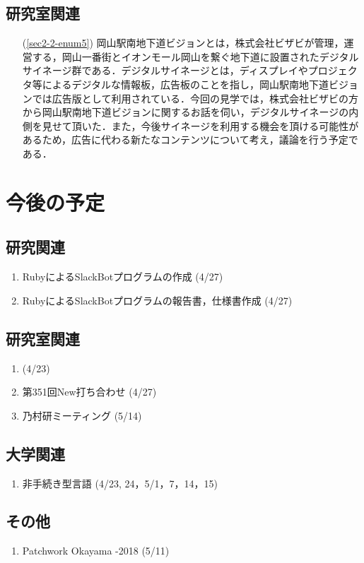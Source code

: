 \documentclass[fleqn, 14pt]{extarticle}
\begin{document}
\subsection{研究室関連}
\label{sec3-2}
\begin{itemize}
\item[(\ref{sec2-2-enum5})] 岡山駅南地下道ビジョンとは，株式会社ビザビが管理，運営する，岡山一番街とイオンモール岡山を繋ぐ地下道に設置されたデジタルサイネージ群である．デジタルサイネージとは，ディスプレイやプロジェクタ等によるデジタルな情報板，広告板のことを指し，岡山駅南地下道ビジョンでは広告版として利用されている．今回の見学では，株式会社ビザビの方から岡山駅南地下道ビジョンに関するお話を伺い，デジタルサイネージの内側を見せて頂いた．また，今後サイネージを利用する機会を頂ける可能性があるため，広告に代わる新たなコンテンツについて考え，議論を行う予定である．
\end{itemize}

\section{今後の予定}
\label{sec4}
\subsection{研究関連}
\label{sec4-1}
\begin{enumerate}
\item RubyによるSlackBotプログラムの作成
  \hfill
  \label{sec4-1-enum1}
  (4/27)
\item RubyによるSlackBotプログラムの報告書，仕様書作成
  \hfill
  \label{sec4-1-enum2}
  (4/27)
\end{enumerate}

\subsection{研究室関連}
\label{sec4-2}
\begin{enumerate}
\item
  \hfill
  \label{sec4-2-enum1}
  (4/23)
\item 第351回New打ち合わせ
  \hfill
  \label{sec4-2-enum1}
  (4/27)
\item 乃村研ミーティング
  \hfill
  \label{sec4-2-enum1}
  (5/14)

\end{enumerate}

\subsection{大学関連}
\label{sec4-3}
\begin{enumerate}
\item 非手続き型言語
  \hfill
  \label{sec4-3-enum1}
  (4/23, 24，5/1，7，14，15)
\end{enumerate}

\subsection{その他}
\label{sec4-3}
\begin{enumerate}
\item  Patchwork Okayama -2018
  \hfill
  \label{sec4-4-enum1}
  (5/11)
\end{enumerate}



\end{document}
